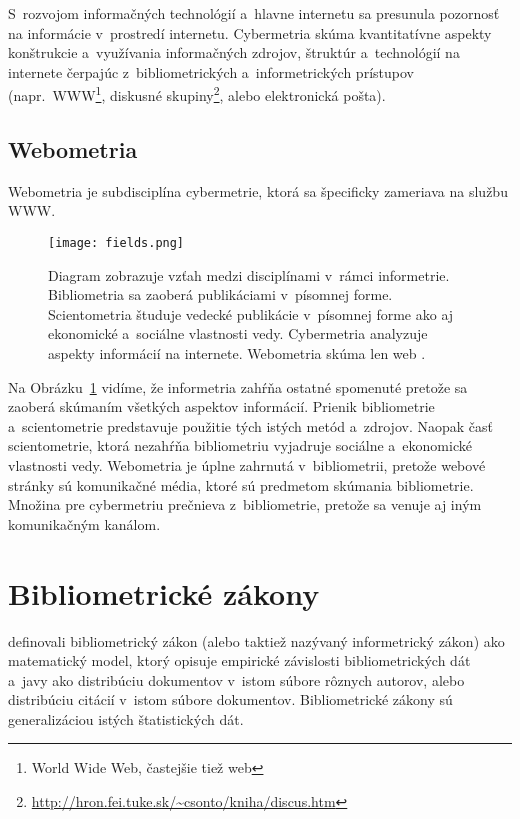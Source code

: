 S~rozvojom informačných technológií a~hlavne internetu sa presunula pozornosť na
informácie v~prostredí internetu.  Cybermetria skúma kvantitatívne aspekty
konštrukcie a~využívania informačných zdrojov, štruktúr a~technológií na
internete čerpajúc z~bibliometrických a~informetrických prístupov
(napr.~WWW\footnote{World Wide Web, častejšie tiež web}, diskusné
skupiny\footnote{\url{http://hron.fei.tuke.sk/~csonto/kniha/discus.htm}}, alebo
elektronická pošta).


\subsection{Webometria}

Webometria je subdisciplína cybermetrie, ktorá sa špecificky zameriava na službu
WWW.

\begin{figure}
  \centering
  \texttt{[image: fields.png]}
  \caption[Vzťah medzi jednotlivými disciplínami v~rámci informetrie]%
  {Diagram zobrazuje vzťah medzi disciplínami v~rámci informetrie.  Bibliometria
    sa zaoberá publikáciami v~písomnej forme.  Scientometria študuje vedecké
    publikácie v~písomnej forme ako aj ekonomické a~sociálne vlastnosti
    vedy.  Cybermetria analyzuje aspekty informácií na internete.  Webometria
    skúma len web \citep{Bjorneborn2004}.}
  \label{fig:fields}
\end{figure}

Na Obrázku~\ref{fig:fields} vidíme, že informetria zahŕňa ostatné spomenuté
 pretože sa zaoberá skúmaním všetkých aspektov informácií.  Prienik
bibliometrie a~scientometrie predstavuje použitie tých istých metód a~zdrojov.
Naopak časť scientometrie, ktorá nezahŕňa bibliometriu vyjadruje sociálne
a~ekonomické vlastnosti vedy.  Webometria je úplne zahrnutá v~bibliometrii,
pretože webové stránky sú komunikačné média, ktoré sú predmetom skúmania
bibliometrie.  Množina pre cybermetriu prečnieva z~bibliometrie, pretože sa
venuje aj iným komunikačným kanálom.

\section{Bibliometrické zákony}

\citet{Todeschini2016} definovali bibliometrický zákon (alebo taktiež nazývaný
informetrický zákon) ako matematický model, ktorý opisuje empirické závislosti
bibliometrických dát a~javy ako distribúciu dokumentov v~istom súbore rôznych
autorov, alebo distribúciu citácií v~istom súbore dokumentov.  Bibliometrické
zákony sú generalizáciou istých štatistických dát.


